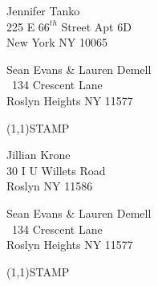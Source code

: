 \documentclass[12pt]{article}
\begin{document}
\begin{center} \begin{Huge} \vspace*{\fill}
Jennifer Tanko\\
225 E $66^{th}$ Street Apt 6D\\
New York NY 10065\\
\vspace{\fill} \end{Huge} \end{center}

\clearpage

\begin{minipage}{.5\linewidth} \noindent
Sean Evans \& Lauren Demell\\\ 
134 Crescent Lane\\ 
Roslyn Heights NY 11577
\end{minipage}
\begin{minipage}{.5\linewidth \hspace{-.2in} \vspace{-.3in}}
\begin{flushright}
\framebox(1,1){STAMP}
\end{flushright}
\end{minipage}

\begin{center} \begin{Huge} \vspace*{\fill}
Jillian Krone\\
30 I U Willets Road\\
Roslyn NY 11586\\
\vspace{\fill} \end{Huge} \end{center}

\clearpage

\begin{minipage}{.5\linewidth} \noindent
Sean Evans \& Lauren Demell\\\ 
134 Crescent Lane\\ 
Roslyn Heights NY 11577
\end{minipage}
\begin{minipage}{.5\linewidth \hspace{-.2in} \vspace{-.3in}}
\begin{flushright}
\framebox(1,1){STAMP}
\end{flushright}
\end{minipage}
\end{document}
